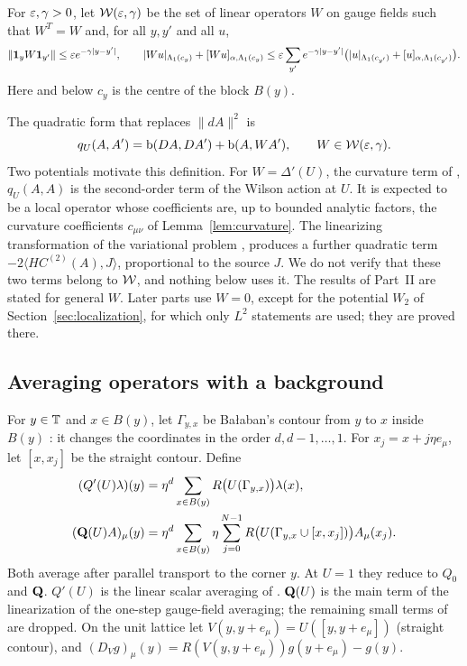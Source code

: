 \begin{definition}
For $\varepsilon,\gamma>0$, let $\mathcal W(\varepsilon,\gamma)$ be the set of linear operators $W$ on gauge fields such that $W^T=W$ and, for all $y,y'$ and all $u$,
\[
\|\mathbf 1_yW\mathbf 1_{y'}\|\le\varepsilon e^{-\gamma|y-y'|},\qquad
|Wu|_{\Lambda_1(c_y)}+[Wu]_{\alpha,\Lambda_1(c_y)}\le\varepsilon\sum_{y'}e^{-\gamma|y-y'|}\big(|u|_{\Lambda_1(c_{y'})}+[u]_{\alpha,\Lambda_1(c_{y'})}\big).
\]
Here and below $c_y$ is the centre of the block $B(y)$.
\end{definition}

The quadratic form that replaces $\|dA\|^2$ is
\[
q_U(A,A')=\mathrm b(DA,DA')+\mathrm b(A,WA'),\qquad W\in\mathcal W(\varepsilon,\gamma).
\]
Two potentials motivate this definition. For $W=\Delta'(U)$, the curvature term of \cite[(3.10)]{BalBackground}, $q_U(A,A)$ is the second-order term of the Wilson action at $U$. It is expected to be a local operator whose coefficients are, up to bounded analytic factors, the curvature coefficients $c_{\mu\nu}$ of Lemma~\ref{lem:curvature}. The linearizing transformation of the variational problem \cite[(79)]{BalVar}, \cite[(3.127)--(3.128)]{BalBackground} produces a further quadratic term $-2\langle HC^{(2)}(A),J\rangle$, proportional to the source $J$. We do not verify that these two terms belong to $\mathcal W$, and nothing below uses it. The results of Part~II are stated for general $W$. Later parts use $W=0$, except for the potential $W_2$ of Section~\ref{sec:localization}, for which only $L^2$ statements are used; they are proved there.

\subsection{Averaging operators with a background}

For $y\in\mathbb T$ and $x\in B(y)$, let $\Gamma_{y,x}$ be Ba\l aban's contour from $y$ to $x$ inside $B(y)$ \cite[(1.7)]{BalPropI}: it changes the coordinates in the order $d,d-1,\dots,1$. For $x_j=x+j\eta e_\mu$, let $[x,x_j]$ be the straight contour. Define
\begin{align*}
(Q'(U)\lambda)(y)&=\eta^d\sum_{x\in B(y)}R\big(U(\Gamma_{y,x})\big)\lambda(x),\\
(\mathbf Q(U)A)_\mu(y)&=\eta^d\sum_{x\in B(y)}\eta\sum_{j=0}^{N-1}R\big(U(\Gamma_{y,x}\cup[x,x_j])\big)A_\mu(x_j).
\end{align*}
Both average after parallel transport to the corner $y$. At $U=1$ they reduce to $Q_0$ and $\mathbf Q$. $Q'(U)$ is the linear scalar averaging of \cite[(3.18), (3.19)]{BalBackground}. $\mathbf Q(U)$ is the main term \cite[(125)]{BalAvg} of the linearization \cite[(124)]{BalAvg} of the one-step gauge-field averaging; the remaining small terms of \cite[(124)]{BalAvg} are dropped. On the unit lattice let $V(y,y+e_\mu)=U([y,y+e_\mu])$ (straight contour), and $(D_Vg)_\mu(y)=R(V(y,y+e_\mu))g(y+e_\mu)-g(y)$.


